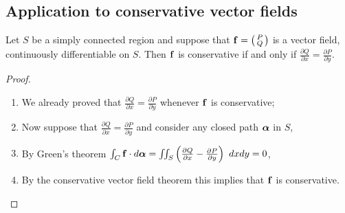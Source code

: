 








\subsection{Application to conservative vector fields}




\begin{theorem}
    Let \(S\) be a simply connected region and suppose that \(\mathbf{f} = \left(\begin{smallmatrix}
            P \\ Q
        \end{smallmatrix}\right)\)
    is a vector field, continuously differentiable on \(S\).
    Then \(\mathbf{f}\) is conservative if and only if \(\tfrac{\partial Q}{\partial x} = \tfrac{\partial P}{\partial y}\).
\end{theorem}

\begin{proof}
    \begin{enumerate}
        \item We already proved that \(\tfrac{\partial Q}{\partial x} = \tfrac{\partial P}{\partial y}\) whenever \(\mathbf{f}\) is conservative;
        \item Now suppose that  \(\tfrac{\partial Q}{\partial x} = \tfrac{\partial P}{\partial y}\) and consider any closed path \(\boldsymbol{\alpha}\) in \(S\),
        \item By Green's theorem \(\int_{C} \mathbf{f} \cdot d\boldsymbol{\alpha} = \iint_{S} \left(\tfrac{\partial Q}{\partial x} - \tfrac{\partial P}{\partial y}\right) \ dxdy = 0\),
        \item By the conservative vector field theorem this implies that \(\mathbf{f}\) is conservative.
    \end{enumerate}
\end{proof}


